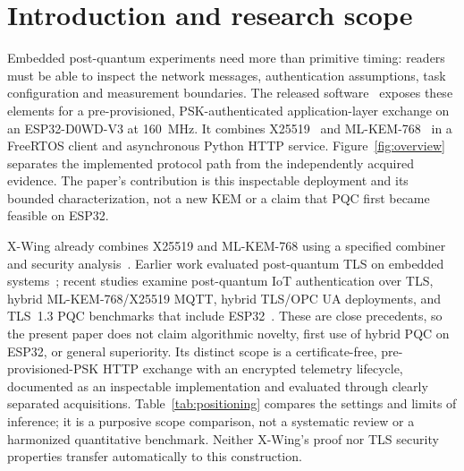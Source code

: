 \documentclass[pdflatex,sn-mathphys-num]{sn-jnl}
\begin{document}
\section{Introduction and research scope}
Embedded post-quantum experiments need more than primitive timing: readers must be able to inspect the network messages, authentication assumptions, task configuration and measurement boundaries. The released software~\cite{software} exposes these elements for a pre-provisioned, PSK-authenticated application-layer exchange on an ESP32-D0WD-V3 at 160~MHz. It combines X25519~\cite{b5,b19} and ML-KEM-768~\cite{b2} in a FreeRTOS client and asynchronous Python HTTP service. Figure~\ref{fig:overview} separates the implemented protocol path from the independently acquired evidence. The paper's contribution is this inspectable deployment and its bounded characterization, not a new KEM or a claim that PQC first became feasible on ESP32.

X-Wing already combines X25519 and ML-KEM-768 using a specified combiner and security analysis~\cite{b41}. Earlier work evaluated post-quantum TLS on embedded systems~\cite{b11}; recent studies examine post-quantum IoT authentication over TLS, hybrid ML-KEM-768/X25519 MQTT, hybrid TLS/OPC UA deployments, and TLS~1.3 PQC benchmarks that include ESP32~\cite{b44,b45,b46,b47}. These are close precedents, so the present paper does not claim algorithmic novelty, first use of hybrid PQC on ESP32, or general superiority. Its distinct scope is a certificate-free, pre-provisioned-PSK HTTP exchange with an encrypted telemetry lifecycle, documented as an inspectable implementation and evaluated through clearly separated acquisitions. Table~\ref{tab:positioning} compares the settings and limits of inference; it is a purposive scope comparison, not a systematic review or a harmonized quantitative benchmark. Neither X-Wing's proof nor TLS security properties transfer automatically to this construction.
\end{document}
